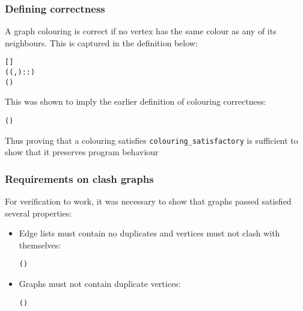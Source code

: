 \documentclass{beamer}
\begin{document}
\begin{frame}[containsverbatim]
\frametitle{Defining correctness}
A graph colouring is correct if no vertex has the same colour as any of its neighbours. This is captured in the definition below:

\begin{alltt}\small
	  \HOLTokenEquiv{} 
  ((,)::) \HOLTokenEquiv{}
  \HOLTokenNotIn{}  (  ) \HOLTokenConj{}   
\end{alltt}

This was shown to imply the earlier definition of colouring correctness:

\begin{alltt}\small
	\HOLTokenTurnstile{}   \HOLTokenImp{}
     (  ) \HOLTokenImp{}
      
\end{alltt}

Thus proving that a colouring satisfies \texttt{colouring\_satisfactory} is sufficient to show that it preserves program behaviour
\end{frame}

\begin{frame}[containsverbatim]
\frametitle{Requirements on clash graphs}
For verification to work, it was necessary to show that graphs passed satisfied several properties:

\begin{itemize}
	\item Edge lists must contain no duplicates and vertices must not clash with themselves:
	
	\begin{alltt}\small
		\HOLTokenTurnstile{}   \HOLTokenImp{}
    (  )
	\end{alltt}
	
	\item Graphs must not contain duplicate vertices:
	
	\begin{alltt}\small
		\HOLTokenTurnstile{}   \HOLTokenImp{}
    (  )
	\end{alltt}
\end{itemize}
\end{frame}
\end{document}
